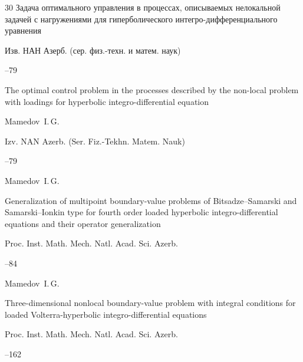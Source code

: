 \begin{thebibliography}{30}
\paper Задача оптимального управления в процессах, описываемых нелокальной задачей с нагружениями для гиперболического интегро-дифференциального уравнения

\jour Изв. НАН Азерб. (сер. физ.-техн. и матем. наук)




--79

\misctransl

\paper The optimal control problem in the processes described by the non-local problem with loadings for hyperbolic integro-differential equation

\by Mamedov~I.\,G.

\jour Izv. NAN Azerb. (Ser. Fiz.-Tekhn. Matem. Nauk)




--79








\by Mamedov~I.\,G.

\paper Generalization of multipoint boundary-value problems of Bitsadze--Samarski and Samarski--Ionkin type for fourth order loaded hyperbolic integro-differential equations and their operator generalization

\jour Proc. Inst. Math. Mech. Natl. Acad. Sci. Azerb. 



--84




\by Mamedov~I.\,G.

\paper Three-dimensional nonlocal boundary-value problem with integral conditions for loaded Volterra-hyperbolic integro-differential equations

\jour Proc. Inst. Math. Mech. Natl. Acad. Sci. Azerb. 



--162









\end{thebibliography}
